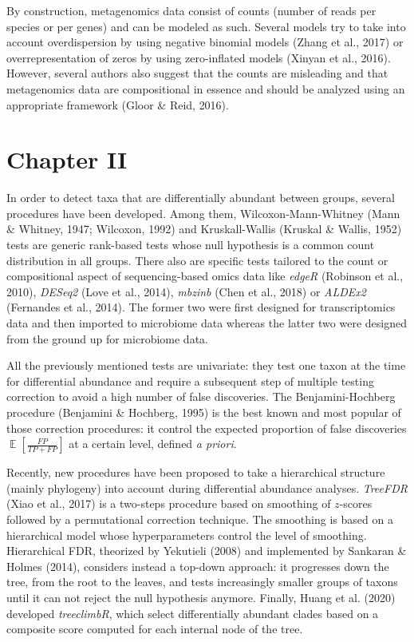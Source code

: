 \documentclass[12pt,a4paper]{reedthesis}
\DeclareMathOperator*{\esp}{\mathbb{E}}
\newcommand \EE [1]{\esp\left[{#1}\right]}
\theoremstyle{definition}
\theoremstyle{definition}
\theoremstyle{definition}
\theoremstyle{remark}
\begin{document}
By construction, metagenomics data consist of counts (number of reads per species or per genes) and can be modeled as such. Several models try to take into account overdispersion by using negative binomial models (Zhang et al., 2017) or overrepresentation of zeros by using zero-inflated models (Xinyan et al., 2016). However, several authors also suggest that the counts are misleading and that metagenomics data are compositional in essence and should be analyzed using an appropriate framework (Gloor \& Reid, 2016).

\hypertarget{chapter-ii}{%
\section*{Chapter II}\label{chapter-ii}}

In order to detect taxa that are differentially abundant between groups, several procedures have been developed. Among them, Wilcoxon-Mann-Whitney (Mann \& Whitney, 1947; Wilcoxon, 1992) and Kruskall-Wallis (Kruskal \& Wallis, 1952) tests are generic rank-based tests whose null hypothesis is a common count distribution in all groups. There also are specific tests tailored to the count or compositional aspect of sequencing-based omics data like \emph{edgeR} (Robinson et al., 2010), \emph{DESeq2} (Love et al., 2014), \emph{mbzinb} (Chen et al., 2018) or \emph{ALDEx2} (Fernandes et al., 2014). The former two were first designed for transcriptomics data and then imported to microbiome data whereas the latter two were designed from the ground up for microbiome data.

All the previously mentioned tests are univariate: they test one taxon at the time for differential abundance and require a subsequent step of multiple testing correction to avoid a high number of false discoveries. The Benjamini-Hochberg procedure (Benjamini \& Hochberg, 1995) is the best known and most popular of those correction procedures: it control the expected proportion of false discoveries \(\EE{\frac{FP}{TP + FP}}\) at a certain level, defined \emph{a priori}.

Recently, new procedures have been proposed to take a hierarchical structure (mainly phylogeny) into account during differential abundance analyses. \emph{TreeFDR} (Xiao et al., 2017) is a two-steps procedure based on smoothing of \(z\)-scores followed by a permutational correction technique. The smoothing is based on a hierarchical model whose hyperparameters control the level of smoothing. Hierarchical FDR, theorized by Yekutieli (2008) and implemented by Sankaran \& Holmes (2014), considers instead a top-down approach: it progresses down the tree, from the root to the leaves, and tests increasingly smaller groups of taxons until it can not reject the null hypothesis anymore. Finally, Huang et al. (2020) developed \emph{treeclimbR}, which select differentially abundant clades based on a composite score computed for each internal node of the tree.
\end{document}
